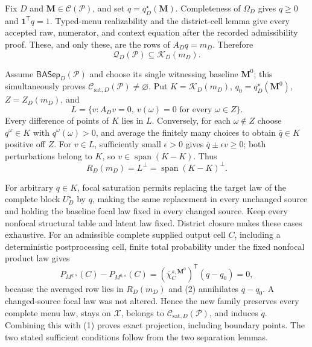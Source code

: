Fix \(D\) and \(\mathbf M\in\mathcal C(\mathcal P)\), and set \(q=q_D^\star(\mathbf M)\).  Completeness of \(\Omega_D\) gives \(q\geq0\) and \(\mathbf1^{\mathsf T}q=1\).  Typed-menu realizability and the district-cell lemma give every accepted raw, numerator, and context equation after the recorded admissibility proof.  These, and only these, are the rows of \(A_Dq=m_D\).  Therefore
\[
\mathcal Q_D(\mathcal P)\subseteq\mathcal K_D(m_D).
\tag{1}
\]

Assume \(\mathsf{BASep}_D(\mathcal P)\) and choose its single witnessing baseline \(\mathbf M^0\); this simultaneously proves \(\mathcal C_{\mathrm{sat},D}(\mathcal P)\ne\varnothing\).  Put \(K=\mathcal K_D(m_D)\), \(q_0=q_D^\star(\mathbf M^0)\), \(Z=Z_D(m_D)\), and
\[
L=\{v:A_Dv=0,\ v(\omega)=0\text{ for every }\omega\in Z\}.
\]
Every difference of points of \(K\) lies in \(L\).  Conversely, for each \(\omega\notin Z\) choose \(q^\omega\in K\) with \(q^\omega(\omega)>0\), and average the finitely many choices to obtain \(\bar q\in K\) positive off \(Z\).  For \(v\in L\), sufficiently small \(\epsilon>0\) gives \(\bar q\pm\epsilon v\geq0\); both perturbations belong to \(K\), so \(v\in\operatorname{span}(K-K)\).  Thus
\[
R_D(m_D)=L^\perp=\operatorname{span}(K-K)^\perp.
\tag{2}
\]

For arbitrary \(q\in K\), focal saturation permits replacing the target law of the complete block \(U_D^\star\) by \(q\), making the same replacement in every unchanged source and holding the baseline focal law fixed in every changed source.  Keep every nonfocal structural table and latent law fixed.  District closure makes these cases exhaustive.  For an admissible complete supplied output cell \(C\), including a deterministic postprocessing cell, finite total probability under the fixed nonfocal product law gives
\[
P_{M^{q,s}}(C)-P_{M^{0,s}}(C)
=(\bar\chi_C^{s,\mathbf M^0})^{\mathsf T}(q-q_0)=0,
\tag{3}
\]
because the averaged row lies in \(R_D(m_D)\) and (2) annihilates \(q-q_0\).  A changed-source focal law was not altered.  Hence the new family preserves every complete menu law, stays on \(\mathcal X\), belongs to \(\mathcal C_{\mathrm{sat},D}(\mathcal P)\), and induces \(q\).  Combining this with (1) proves exact projection, including boundary points.  The two stated sufficient conditions follow from the two separation lemmas.